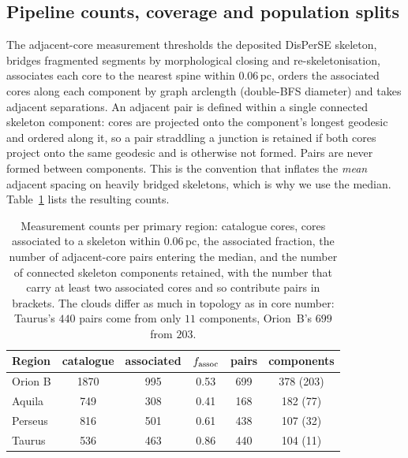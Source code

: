 \documentclass[usenatbib,twoside,twocolumn]{mnras}
\begin{document}
\subsection{Pipeline counts, coverage and population splits}
\label{sec:nnpipeline}

The adjacent-core measurement thresholds the deposited DisPerSE skeleton, bridges fragmented segments by morphological closing and re-skeletonisation, associates each core to the nearest spine within $0.06$\,pc, orders the associated cores along each component by graph arclength (double-BFS diameter) and takes adjacent separations. An adjacent pair is defined within a single connected skeleton component: cores are projected onto the component's longest geodesic and ordered along it, so a pair straddling a junction is retained if both cores project onto the same geodesic and is otherwise not formed. Pairs are never formed between components. This is the convention that inflates the \emph{mean} adjacent spacing on heavily bridged skeletons, which is why we use the median. Table~\ref{tab:nnpipeline} lists the resulting counts.

\begin{table}
\caption{Measurement counts per primary region: catalogue cores, cores associated to a skeleton within $0.06$\,pc, the associated fraction, the number of adjacent-core pairs entering the median, and the number of connected skeleton components retained, with the number that carry at least two associated cores and so contribute pairs in brackets. The clouds differ as much in topology as in core number: Taurus's $440$ pairs come from only $11$ components, Orion~B's $699$ from $203$.}
\label{tab:nnpipeline}
\footnotesize
\setlength{\tabcolsep}{5pt}
\begin{tabular}{lccccc}
\toprule
Region & catalogue & associated & $f_{\rm assoc}$ & pairs & components \\
\midrule
Orion B & 1870 & 995 & 0.53 & 699 & 378 (203) \\
Aquila  &  749 & 308 & 0.41 & 168 & 182 (77) \\
Perseus &  816 & 501 & 0.61 & 438 & 107 (32) \\
Taurus  &  536 & 463 & 0.86 & 440 & 104 (11) \\
\bottomrule
\end{tabular}
\end{table}
\end{document}
